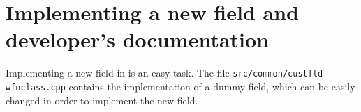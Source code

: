 
\chapter{Implementing a new field and developer's documentation}

Implementing a new field in \DTK{} is an easy task. The file \texttt{src/\-com\-mon/\-cust\-fld-wfn\-class.\-cpp}
contains the implementation of a dummy field, which can be easily changed in order to implement
the new field.

